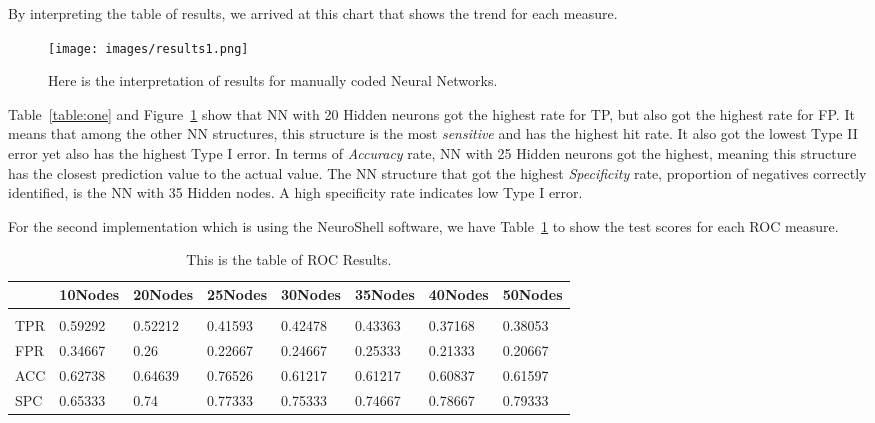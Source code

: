\documentclass[journal]{./IEEE/IEEEtran}
\begin{document}
By interpreting the table of results, we arrived at this chart that shows the trend for each measure.

\begin{figure}[h]
\begin{center}
\texttt{[image: images/results1.png]}
\caption{Here is the interpretation of results for manually coded Neural Networks.}
\label{fig:nnetworks}
\end{center}
\end{figure}

Table~\ref{table:one} and Figure~\ref{fig:nnetworks} show that NN with 20 Hidden neurons got the highest rate for TP, but also got the highest rate for FP. It means that among the other NN structures, this structure is the most {\it sensitive} and has the highest hit rate. It also got the lowest Type II error yet also has the highest Type I error. In terms of {\it Accuracy} rate, NN with 25 Hidden neurons got the highest, meaning this structure has the closest prediction value to the actual value. The NN structure that got the highest {\it Specificity} rate, proportion of negatives correctly identified, is the NN with 35 Hidden nodes. A high specificity rate indicates low Type I error.

For the second implementation which is using the NeuroShell software, we have Table~\ref{table:two} to show the test scores for each ROC measure.

\begin{table}[ht]
\caption{This is the table of ROC Results.} %
\tabcolsep=0.08cm
\begin{tabular}{llllllll}
\hline\hline %
~ & 10Nodes  & 20Nodes  & 25Nodes & 30Nodes  & 35Nodes  & 40Nodes  & 50Nodes \\
\hline \\[0.1ex]
 TPR & 0.59292 & 0.52212   &    0.41593    &    0.42478    &    0.43363    &    0.37168    &    0.38053   \\
 FPR     & 0.34667 &    0.26    &    0.22667    &    0.24667    &    0.25333         &    0.21333    &    0.20667    \\
 ACC     & 0.62738 &    0.64639    &    0.76526    &    0.61217    &    0.61217    &    0.60837    &    0.61597    \\
 SPC     &    0.65333      &    0.74     &    0.77333     &    0.75333     & 0.74667            &    0.78667     &    0.79333     \\
\hline
\end{tabular}
\label{table:two} %
\end{table}
\end{document}

